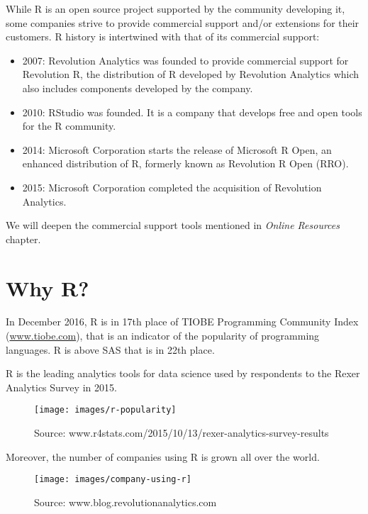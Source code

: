 \documentclass[]{book}
\providecommand{\tightlist}{%
  \setlength{\itemsep}{0pt}\setlength{\parskip}{0pt}}
\def\tightlist{}
\begin{document}
While R is an open source project supported by the community developing
it, some companies strive to provide commercial support and/or
extensions for their customers. R history is intertwined with that of
its commercial support:

\begin{itemize}
\tightlist
\item
  2007: Revolution Analytics was founded to provide commercial support
  for Revolution R, the distribution of R developed by Revolution
  Analytics which also includes components developed by the company.
\item
  2010: RStudio was founded. It is a company that develops free and open
  tools for the R community.
\item
  2014: Microsoft Corporation starts the release of Microsoft R Open, an
  enhanced distribution of R, formerly known as Revolution R Open (RRO).
\item
  2015: Microsoft Corporation completed the acquisition of Revolution
  Analytics.
\end{itemize}

We will deepen the commercial support tools mentioned in \emph{Online
Resources} chapter.

\section{Why R?}\label{why-r}

In December 2016, R is in 17th place of TIOBE Programming Community
Index (\href{http://www.tiobe.com/tiobe-index/}{www.tiobe.com}), that is
an indicator of the popularity of programming languages. R is above SAS
that is in 22th place.

R is the leading analytics tools for data science used by respondents to
the Rexer Analytics Survey in 2015.

\begin{figure}[h]

{\centering \texttt{[image: images/r-popularity]} 

}

\caption{Source: www.r4stats.com/2015/10/13/rexer-analytics-survey-results}\label{fig:g5}
\end{figure}

Moreover, the number of companies using R is grown all over the world.

\begin{figure}[h]

{\centering \texttt{[image: images/company-using-r]} 

}

\caption{Source: www.blog.revolutionanalytics.com}\label{fig:g6}
\end{figure}
\end{document}
